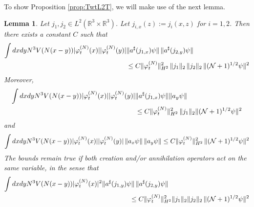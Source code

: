 \documentclass[11pt,a4paper,DIV11]{scrartcl}	%
\newtheorem{lemma}[thm]{Lemma}
\newcommand{\bR}{{\mathbb R}}
\newcommand{\cN}{{\cal N}}
\begin{document}
To show Proposition \ref{prop:TwtL2T}, we will make use of the next lemma.
\begin{lemma}\label{lm:2b}
Let $j_1, j_2 \in L^2 (\bR^3 \times \bR^3)$. Let $j_{i,x} (z) := j_i (x,z)$ for $i=1,2$. Then there exists a constant $C$ such that 
\begin{equation}\label{eq:lm2b-1}  
\begin{split}
\int dx dy N^3 V(N (x-y)) |\varphi_t^{(N)} (x)| |\varphi_t^{(N)} (y)| & \| a^\sharp (j_{1,x}) \psi \| \, \| a^\sharp (j_{2,y}) \psi \| \\  &\leq C \| \varphi_t^{(N)} \|_{H^2}^2  \, \| j_1 \|_2 \, \| j_2 \|_2 \, \| (\cN+1)^{1/2} \psi \|^2 \end{split} \end{equation}
Moreover,  
\begin{equation}\label{eq:lm2b-2} 
\begin{split}
\int dx dy N^3 V(N (x-y)) |\varphi_t^{(N)} (x)| |\varphi_t^{(N)} (y)| &\| a^\sharp (j_{1,x}) \psi \|  \| a_y \psi \| \\&\leq C\| \varphi_t^{(N)} \|_{H^2}^2  \, \| j_1 \|_2 \| (\cN+1)^{1/2} \psi \|^2 \end{split} \end{equation}
and 
\begin{equation}\label{eq:lm2b-3}
\int dx dy N^3 V(N (x-y))   |\varphi_t^{(N)} (x)| |\varphi_t^{(N)} (y)|  \, \| a_x \psi \| \, \|  a_y  \psi \|  
\leq C \| \varphi_t^{(N)}\|_{H^2}^2  \,\| (\cN+1)^{1/2} \psi \|^2 
\end{equation}
The bounds remain true if both creation and/or annihilation operators act on the same variable, in the sense that
\begin{equation}\label{eq:lm2b-4} \begin{split}
 \int dx dy N^3 V(N (x-y))&|\varphi_t^{(N)} (x)|^2 \| a^\sharp (j_{1,y})  \psi \| \, \|  a^\sharp (j_{2,y}) \psi \|  
 \\  &\hspace{3cm} \leq C\| \varphi_t^{(N)} \|_{H^2}^2 \|j_1 \|_2 \| j_2 \|_2 \, \| (\cN+1)^{1/2} \psi \|^2 \\

\end{split}
\end{equation}
\end{lemma}
\end{document}
